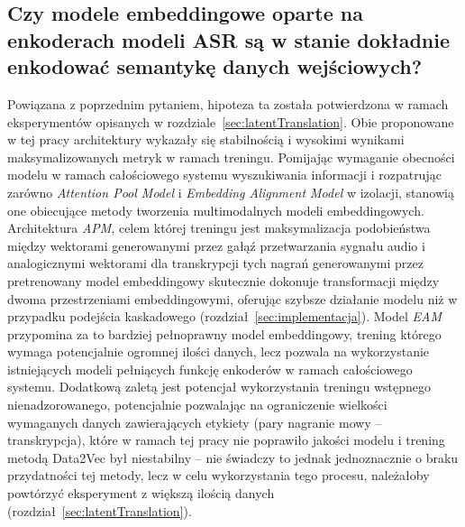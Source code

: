 \subsection{Czy modele embeddingowe oparte na enkoderach modeli ASR są w stanie dokładnie enkodować semantykę danych wejściowych?}
Powiązana z poprzednim pytaniem, hipoteza ta została potwierdzona w ramach eksperymentów opisanych w rozdziale~\ref{sec:latentTranslation}. Obie proponowane w tej pracy architektury wykazały się stabilnością i wysokimi wynikami maksymalizowanych metryk w ramach treningu. Pomijając wymaganie obecności modelu w ramach całościowego systemu wyszukiwania informacji i rozpatrując zarówno \textit{Attention Pool Model} i \textit{Embedding Alignment Model} w izolacji, stanowią one obiecujące metody tworzenia multimodalnych modeli embeddingowych. Architektura \textit{APM}, celem której treningu jest maksymalizacja podobieństwa między wektorami generowanymi przez gałąź przetwarzania sygnału audio i analogicznymi wektorami dla transkrypcji tych nagrań generowanymi przez pretrenowany model embeddingowy skutecznie dokonuje transformacji między dwoma przestrzeniami embeddingowymi, oferując szybsze działanie modelu niż w przypadku podejścia kaskadowego (rozdział~\ref{sec:implementacja}). Model \textit{EAM} przypomina za to bardziej pełnoprawny model embeddingowy, trening którego wymaga potencjalnie ogromnej ilości danych, lecz pozwala na wykorzystanie istniejących modeli pełniących funkcję enkoderów w ramach całościowego systemu. Dodatkową zaletą jest potencjał wykorzystania treningu wstępnego nienadzorowanego, potencjalnie pozwalając na ograniczenie wielkości wymaganych danych zawierających etykiety (pary nagranie mowy -- transkrypcja), które w ramach tej pracy nie poprawiło jakości modelu i trening metodą Data2Vec był niestabilny -- nie świadczy to jednak jednoznacznie o braku przydatności tej metody, lecz w celu wykorzystania tego procesu, należałoby powtórzyć eksperyment z większą ilością danych (rozdział~\ref{sec:latentTranslation}).
